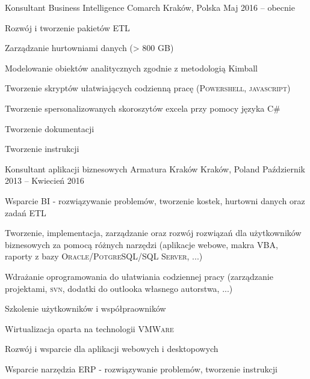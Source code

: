 \begin{cventries}
  	\cventry
		{Konsultant Business Intelligence} 
		{Comarch} 
		{Kraków, Polska} 
		{Maj 2016 -- obecnie} 
		{
			\begin{cvitems} 
				\item {Rozwój i tworzenie pakietów ETL}
				\item {Zarządzanie hurtowniami danych (> 800 GB)}
				\item {Modelowanie obiektów analitycznych zgodnie z metodologią Kimball}
				\item {Tworzenie skryptów ułatwiających codzienną pracę (\textsc{Powershell}, \textsc{javascript})}
				\item {Tworzenie spersonalizowanych skoroszytów excela przy pomocy języka C\#}
				\item {Tworzenie dokumentacji}
				\item {Tworzenie instrukcji}
			\end{cvitems}
		}
  	\cventry
		{Konsultant aplikacji biznesowych}
		{Armatura Kraków}
		{Kraków, Poland}
		{Październik 2013 -- Kwiecień 2016}
		{
			\begin{cvitems} 
				\item {Wsparcie BI - rozwiązywanie problemów, tworzenie kostek, hurtowni danych oraz zadań \textsc{ETL}}
				\item {Tworzenie, implementacja, zarządzanie oraz rozwój rozwiązań dla użytkowników biznesowych za pomocą różnych narzędzi (aplikacje webowe, makra \textsc{VBA}, raporty z bazy \textsc{Oracle}/\textsc{PotgreSQL}/\textsc{SQL Server}, ...)}
				\item {Wdrażanie oprogramowania do ułatwiania codziennej pracy (zarządzanie projektami, \textsc{svn}, dodatki do outlooka własnego autorstwa, ...)}
				\item {Szkolenie użytkowników i współpraowników}
				\item {Wirtualizacja oparta na technologii \textsc{VMWare}}
   				\item {Rozwój i wsparcie dla aplikacji webowych i desktopowych}
				\item {Wsparcie narzędzia ERP - rozwiązywanie problemów, tworzenie instrukcji}

\end{cvitems}}
\end{cventries}
